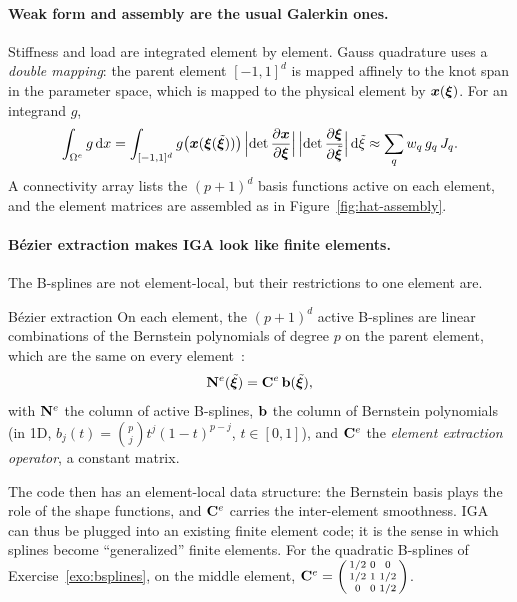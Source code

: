 \paragraph{Weak form and assembly are the usual Galerkin ones.}
%
Stiffness and load are integrated element by element. Gauss quadrature uses a
\emph{double mapping}: the parent element $[-1,1]^d$ is mapped affinely to
the knot span in the parameter space, which is mapped to the physical
element by $\bm{x}(\bm{\xi})$. For an integrand $g$,
\[
  \int_{\Omega^e}g\,\mathrm{d} x=\int_{[-1,1]^d}g\bigl(\bm{x}(\bm{\xi}(\tilde{\bm{\xi}}))\bigr)
  \,\Bigl|\det\frac{\partial\bm{x}}{\partial\bm{\xi}}\Bigr|\,
  \Bigl|\det\frac{\partial\bm{\xi}}{\partial\tilde{\bm{\xi}}}\Bigr|\,\mathrm{d}\tilde\xi
  \approx\sum_qw_q\,g_q\,J_q .
\]
A connectivity array lists the $(p+1)^d$ basis functions active on each
element, and the element matrices are assembled as in
Figure~\ref{fig:hat-assembly}.

\paragraph{B\'ezier extraction makes IGA look like finite elements.}
%
The B-splines are not element-local, but their restrictions to one element
are.
\begin{gbox}{B\'ezier extraction}
On each element, the $(p+1)^d$ active B-splines are linear combinations of the
Bernstein polynomials of degree $p$ on the parent element, which are the same
on every element~\cite{BordenExtraction2011}:
\[
  \mathbf{N}^e(\tilde{\bm{\xi}})=\mathbf{C}^e\,\mathbf{b}(\tilde{\bm{\xi}}),
\]
with $\mathbf{N}^e$ the column of active B-splines, $\mathbf{b}$ the column of
Bernstein polynomials (in 1D, $b_j(t)=\binom pjt^j(1-t)^{p-j}$, $t\in[0,1]$),
and $\mathbf{C}^e$ the \emph{element extraction operator}, a constant matrix.
\end{gbox}
The code then has an element-local data structure: the Bernstein basis plays
the role of the shape functions, and $\mathbf{C}^e$ carries the inter-element
smoothness. IGA can thus be plugged into an existing finite element code;
it is the sense in which splines become ``generalized'' finite elements. For
the quadratic B-splines of Exercise~\ref{exo:bsplines}, on the middle element,
$\mathbf{C}^e=\begin{psmallmatrix}1/2&0&0\\1/2&1&1/2\\0&0&1/2\end{psmallmatrix}$.

